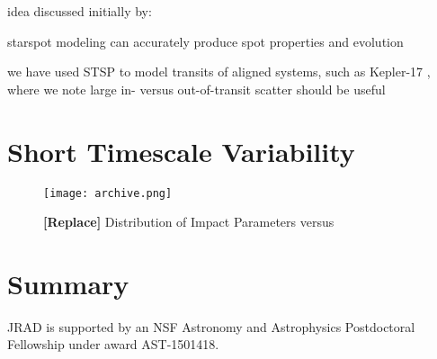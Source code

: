 \documentclass[preprint2]{aastex61}
\begin{document}
idea discussed initially by:
\cite{gomez2015}

starspot modeling can accurately produce spot properties and evolution
\cite{davenport2015b}

we have used STSP to model transits of aligned systems, such as Kepler-17
\cite{davenport_phd}, where we note large in- versus out-of-transit scatter should be useful


\section{Short Timescale Variability}
\label{sec:short}


\begin{figure}[!t]
\centering
\texttt{[image: archive.png]}
\caption{{\bf [Replace]} Distribution of Impact Parameters versus }
\label{fig:medtime}
\end{figure}





\section{Summary}
\label{sec:summary}


\acknowledgments

JRAD is supported by an NSF Astronomy and Astrophysics Postdoctoral Fellowship under award AST-1501418. 



\end{document}
